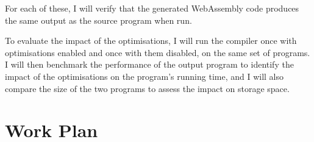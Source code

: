 \documentclass[12pt,a4paper]{article}
\begin{document}
For each of these, I will verify that the generated WebAssembly code produces the same output as the source program when run.

To evaluate the impact of the optimisations, I will run the compiler once with optimisations enabled and once with them disabled, on the same set of programs. I will then benchmark the performance of the output program to identify the impact of the optimisations on the program's running time, and I will also compare the size of the two programs to assess the impact on storage space.

\section*{Work Plan}

\newcommand\workpackagenumber{\stepcounter{workpackages}\arabic{workpackages}}
\end{document}
